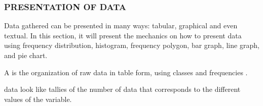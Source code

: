 \subsubsection*{PRESENTATION OF DATA}
Data gathered can be presented in many ways: tabular, graphical and
even textual. In this section, it will present the mechanics on how to present
data using frequency distribution, histogram, frequency polygon, bar graph,
line graph, and pie chart.
\begin{definition}
A  is the organization of raw data in table form, using
classes and frequencies \parencite{bulman}.
\end{definition}
 data look like tallies of the number of data that
corresponds to the different values of the variable.
